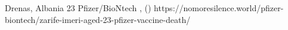           {Drenas, Albania}
          {23}
          {Pfizer/BioNtech}
          {}
          {
            ,
             ()
          }
          {https://nomoresilence.world/pfizer-biontech/zarife-imeri-aged-23-pfizer-vaccine-death/}
